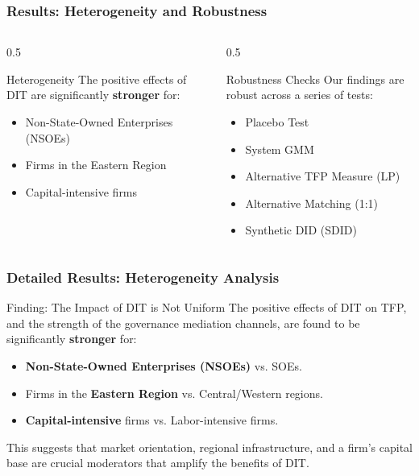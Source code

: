 \documentclass[aspectratio=169]{beamer}
\begin{document}
\begin{frame}
  \frametitle{Results: Heterogeneity and Robustness}
  \begin{columns}[T]
    \begin{column}{0.5\textwidth}
      \begin{block}{Heterogeneity}
        The positive effects of DIT are significantly \textbf{stronger} for:
        \begin{itemize}
          \item Non-State-Owned Enterprises (NSOEs)
          \item Firms in the Eastern Region
          \item Capital-intensive firms
        \end{itemize}
      \end{block}
    \end{column}
    \begin{column}{0.5\textwidth}
      \begin{alertblock}{Robustness Checks}
        Our findings are robust across a series of tests:
        \begin{itemize}
          \item Placebo Test
          \item System GMM
          \item Alternative TFP Measure (LP)
          \item Alternative Matching (1:1)
          \item Synthetic DID (SDID)
        \end{itemize}
      \end{alertblock}
    \end{column}
  \end{columns}
\end{frame}

\begin{frame}
    \frametitle{Detailed Results: Heterogeneity Analysis}
    \begin{alertblock}{Finding: The Impact of DIT is Not Uniform}
        The positive effects of DIT on TFP, and the strength of the governance mediation channels, are found to be significantly \textbf{stronger} for:
        \begin{itemize}
            \item \textbf{Non-State-Owned Enterprises (NSOEs)} vs. SOEs.
            \item Firms in the \textbf{Eastern Region} vs. Central/Western regions.
            \item \textbf{Capital-intensive} firms vs. Labor-intensive firms.
        \end{itemize}
        \vfill
        \pause
        This suggests that market orientation, regional infrastructure, and a firm's capital base are crucial moderators that amplify the benefits of DIT.
    \end{alertblock}
\end{frame}
\end{document}
